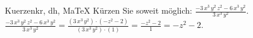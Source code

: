 \begin{MAufgabe}{Kuerzen}{kr, dh, MaTeX}
K\"urzen Sie soweit m\"oglich: $\frac{ - 3\, x^3\, y^2\, z^2 - 6\, x^3\, y^2}{3\, x^3\, y^2}$.\\ 
\ifLsg\MLoesung
\quad $\frac{ - 3\, x^3\, y^2\, z^2 - 6\, x^3\, y^2}{3\, x^3\, y^2}=\frac{(3\, x^3\, y^2)\cdot( - z^2 - 2)}{(3\, x^3\, y^2)\cdot(1)}=\frac{ - z^2 - 2}{1}= - z^2 - 2$.\else\relax\fi
 \end{MAufgabe}